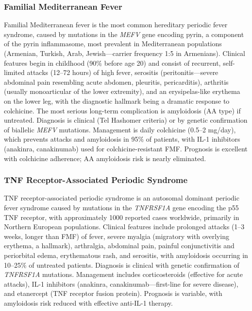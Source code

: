 \subsubsection{Familial Mediterranean Fever}
Familial Mediterranean fever is the most common hereditary periodic fever syndrome, caused by mutations in the \textit{MEFV} gene encoding pyrin, a component of the pyrin inflammasome, most prevalent in Mediterranean populations (Armenian, Turkish, Arab, Jewish---carrier frequency 1:5 in Armenians). Clinical features begin in childhood (90\% before age 20) and consist of recurrent, self-limited attacks (12--72 hours) of high fever, serositis (peritonitis---severe abdominal pain resembling acute abdomen, pleuritis, pericarditis), arthritis (usually monoarticular of the lower extremity), and an erysipelas-like erythema on the lower leg, with the diagnostic hallmark being a dramatic response to colchicine. The most serious long-term complication is amyloidosis (AA type) if untreated. Diagnosis is clinical (Tel Hashomer criteria) or by genetic confirmation of biallelic \textit{MEFV} mutations. Management is daily colchicine (0.5--2 mg/day), which prevents attacks and amyloidosis in 95\% of patients, with IL-1 inhibitors (anakinra, canakinumab) used for colchicine-resistant FMF. Prognosis is excellent with colchicine adherence; AA amyloidosis risk is nearly eliminated.

\subsubsection{TNF Receptor-Associated Periodic Syndrome}
TNF receptor-associated periodic syndrome is an autosomal dominant periodic fever syndrome caused by mutations in the \textit{TNFRSF1A} gene encoding the p55 TNF receptor, with approximately 1000 reported cases worldwide, primarily in Northern European populations. Clinical features include prolonged attacks (1--3 weeks, longer than FMF) of fever, severe myalgia (migratory with overlying erythema, a hallmark), arthralgia, abdominal pain, painful conjunctivitis and periorbital edema, erythematous rash, and serositis, with amyloidosis occurring in 10--25\% of untreated patients. Diagnosis is clinical with genetic confirmation of \textit{TNFRSF1A} mutations. Management includes corticosteroids (effective for acute attacks), IL-1 inhibitors (anakinra, canakinumab---first-line for severe disease), and etanercept (TNF receptor fusion protein). Prognosis is variable, with amyloidosis risk reduced with effective anti-IL-1 therapy.

